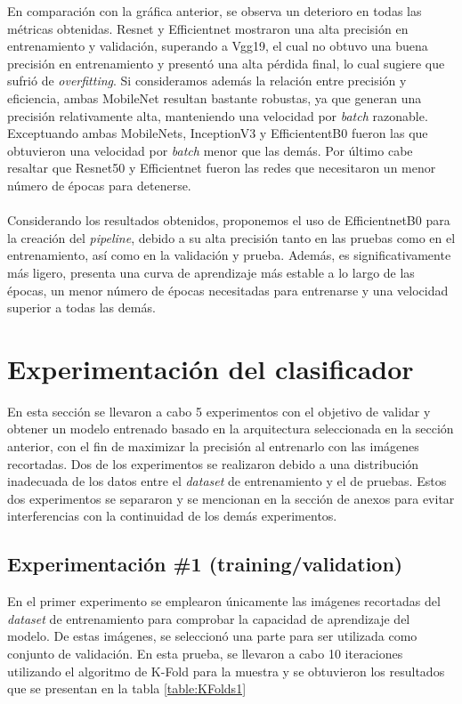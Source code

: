 En comparación con la gráfica anterior, se observa un deterioro en todas las métricas obtenidas. Resnet y Efficientnet mostraron una alta precisión en entrenamiento y validación, superando a Vgg19, el cual no obtuvo una buena precisión en entrenamiento y presentó una alta pérdida final, lo cual sugiere que sufrió de \textit{overfitting}. Si consideramos además la relación entre precisión y eficiencia, ambas MobileNet resultan bastante robustas, ya que generan una precisión relativamente alta, manteniendo una velocidad por \textit{batch} razonable. Exceptuando ambas MobileNets, InceptionV3 y EfficiententB0 fueron las que obtuvieron una velocidad por \textit{batch} menor que las demás. Por último cabe resaltar que Resnet50 y Efficientnet fueron las redes que necesitaron un menor número de épocas para detenerse. 
\\\\
Considerando los resultados obtenidos, proponemos el uso de EfficientnetB0 para la creación del \textit{pipeline}, debido a su alta precisión tanto en las pruebas como en el entrenamiento, así como en la validación y prueba. Además, es significativamente más ligero, presenta una curva de aprendizaje más estable a lo largo de las épocas, un menor número de épocas necesitadas para entrenarse y una velocidad superior a todas las demás.

\section{Experimentación del clasificador}

En esta sección se llevaron a cabo 5 experimentos con el objetivo de validar y 
obtener un modelo entrenado basado en la arquitectura seleccionada en la sección anterior, 
con el fin de maximizar la precisión al entrenarlo con las imágenes recortadas. Dos de los 
experimentos se realizaron debido a una distribución inadecuada de los datos entre el 
\textit{dataset} de entrenamiento y el de pruebas. Estos dos experimentos se separaron y se 
mencionan en la sección de anexos para evitar interferencias con la continuidad de los demás 
experimentos.
\subsection{Experimentación \#1 (training/validation)}

En el primer experimento se emplearon únicamente las imágenes recortadas del \textit{dataset} 
de entrenamiento para comprobar la capacidad de aprendizaje del modelo. De estas imágenes, 
se seleccionó una parte para ser utilizada como conjunto de validación. En esta prueba, 
se llevaron a cabo 10 iteraciones utilizando el algoritmo de K-Fold para la muestra y se 
obtuvieron los resultados que se presentan en la tabla \ref{table:KFolds1}
\\

